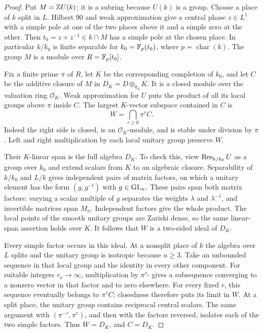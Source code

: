 \begin{proof}
Put $M=\mathbb Z U(k)$; it is a subring because $U(k)$ is a group. Choose
a place of $k$ split in $L$. Hilbert 90 and weak approximation give
a central phase $z\in L^1$ with a simple pole at one of the two places
above it and a simple zero at the other. Then
$t_0=z+z^{-1}\in k\cap M$ has a simple pole at the chosen place.
In particular $k/ k_0$ is finite separable for
$k_0=\mathbb F_p(t_0)$, where $p=\operatorname{char}(k)$.
The group $M$ is a module over $R=\mathbb F_p[t_0]$.

Fix a finite prime $\pi$ of $R$, let $K$ be the corresponding
completion of $k_0$, and let $C$ be the additive closure of $M$ in
$D_K=D\otimes_{k_0}K$. It is a closed module over the valuation ring
$\mathcal O_K$. Weak approximation for $U$ puts the product of all
its local groups above $\pi$ inside $C$. The largest $K$-vector
subspace contained in $C$ is
\[
 W=\bigcap_{r\geq0}\pi^r C.
\]
Indeed the right side is closed, is an $\mathcal O_K$-module, and is
stable under division by $\pi$. Left and right multiplication by each
local unitary group preserve $W$.

Their $K$-linear span is the full algebra $D_K$. To check this, view
$\operatorname{Res}_{k/k_0}U$ as a group over $k_0$ and extend scalars from $K$
to an algebraic closure. Separability of $k/k_0$ and $L/k$ gives
independent pairs of matrix factors, on which a unitary
element has the form $(g,g^{-t})$ with $g\in\operatorname{GL}_n$. These pairs span
both matrix factors: varying a scalar multiple of $g$ separates the
weights $\lambda$ and $\lambda^{-1}$, and invertible matrices span
$M_n$. Independent factors give the whole product. The local points
of the smooth unitary groups are Zariski dense, so the same linear-span
assertion holds over $K$. It follows that $W$ is a two-sided ideal of
$D_K$.

Every simple factor occurs in this ideal. At a nonsplit place of $k$
the algebra over $L$ splits and the unitary group is isotropic because
$n\geq3$. Take an unbounded sequence in that local group and the
identity in every other component. For suitable integers
$r_\nu\to\infty$, multiplication by $\pi^{r_\nu}$ gives a subsequence
converging to a nonzero vector in that factor and to zero elsewhere.
For every fixed $r$, this sequence eventually belongs to $\pi^rC$;
closedness therefore puts its limit in $W$. At a split place, the
unitary group contains reciprocal central scalars. The same argument
with $(\pi^{-r},\pi^r)$, and then with the factors reversed, isolates
each of the two simple factors. Thus $W=D_K$, and $C=D_K$.


\end{proof}
